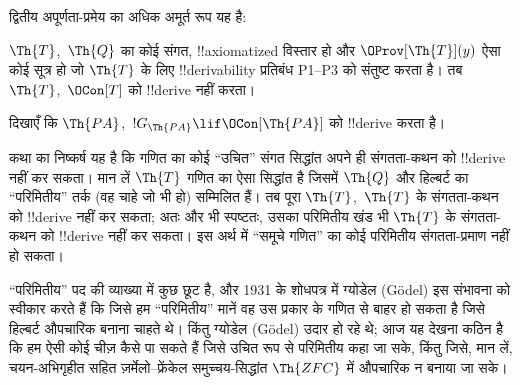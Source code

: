 \documentclass[../../../include/open-logic-section]{subfiles}
\begin{document}
द्वितीय अपूर्णता-प्रमेय का अधिक अमूर्त रूप यह है:

\begin{thm}
 $\Th{T}$,~$\Th{Q}$ का कोई संगत,
!!{axiomatized} विस्तार हो और $\OProv[\Th{T}](y)$ ऐसा कोई सूत्र हो जो
$\Th{T}$ के लिए !!{derivability} प्रतिबंध P1--P3 को संतुष्ट करता है। तब
$\Th{T}$,~$\OCon[T]$ को !!{derive} नहीं करता।
\end{thm}

\begin{prob}
दिखाएँ कि $\Th{PA}$,~$!G_{\Th{PA}} \lif \OCon[\Th{PA}]$ को !!{derive}
करता है।
\end{prob}

\begin{digress}
कथा का निष्कर्ष यह है कि गणित का कोई ``उचित'' संगत सिद्धांत अपने ही
संगतता-कथन को !!{derive} नहीं कर सकता। मान लें $\Th{T}$ गणित का ऐसा
सिद्धांत है जिसमें $\Th{Q}$ और हिल्बर्ट का ``परिमितीय'' तर्क (वह चाहे जो
भी हो) सम्मिलित हैं। तब पूरा $\Th{T}$,~$\Th{T}$ के संगतता-कथन को
!!{derive} नहीं कर सकता; अतः और भी स्पष्टतः, उसका परिमितीय खंड भी
$\Th{T}$ के संगतता-कथन को !!{derive} नहीं कर सकता। इस अर्थ में ``समूचे
गणित'' का कोई परिमितीय संगतता-प्रमाण नहीं हो सकता।

``परिमितीय'' पद की व्याख्या में कुछ छूट है, और 1931 के शोधपत्र में ग्योडेल (G\"odel)
इस संभावना को स्वीकार करते हैं कि जिसे हम ``परिमितीय'' मानें वह उस प्रकार
के गणित से बाहर हो सकता है जिसे हिल्बर्ट औपचारिक बनाना चाहते थे। किंतु
ग्योडेल (G\"odel) उदार हो रहे थे; आज यह देखना कठिन है कि हम ऐसी कोई चीज़ कैसे पा
सकते हैं जिसे उचित रूप से परिमितीय कहा जा सके, किंतु जिसे, मान लें,
चयन-अभिगृहीत सहित ज़र्मेलो--फ्रेंकेल समुच्चय-सिद्धांत $\Th{ZFC}$ में
औपचारिक न बनाया जा सके।
\end{digress}
\end{document}
